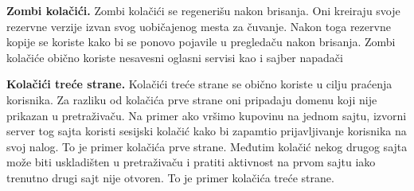 \documentclass[a4paper]{article}
\begin{document}
	\textbf{Zombi kolačići.} Zombi kolačići se regenerišu nakon brisanja. Oni kreiraju svoje rezervne verzije izvan svog uobičajenog mesta za čuvanje. Nakon toga rezervne kopije se koriste kako bi se ponovo pojavile u pregledaču nakon brisanja. Zombi kolačiće obično koriste nesavesni oglasni servisi kao i sajber napadači 
	
	\textbf{Kolačići treće strane.} Kolačići treće strane se obično koriste u cilju praćenja korisnika. Za razliku od kolačića prve strane oni pripadaju domenu koji nije prikazan u pretraživaču. Na primer ako vršimo kupovinu na jednom sajtu, izvorni server tog sajta koristi sesijski kolačić kako bi zapamtio prijavljivanje korisnika na svoj nalog. To je primer kolačića prve strane. Međutim kolačić nekog drugog sajta može biti uskladišten u pretraživaču i pratiti aktivnost na prvom sajtu iako trenutno drugi sajt nije otvoren. To je primer kolačića treće strane. 
	
\end{document}
